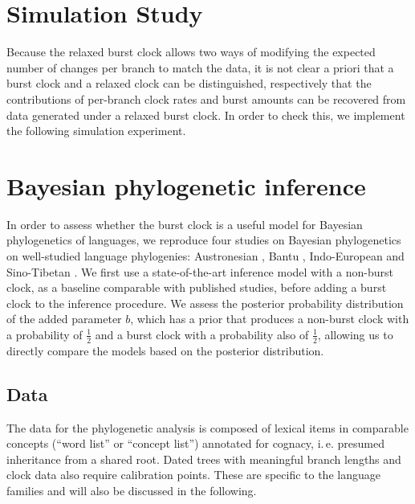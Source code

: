\documentclass[a4paper,12pt]{scrartcl}
\begin{document}
\section{Simulation Study}
Because the relaxed burst clock allows two ways of modifying the expected number
of changes per branch to match the data, it is not clear a priori that a burst
clock and a relaxed clock can be distinguished, respectively that the
contributions of per-branch clock rates and burst amounts can be recovered from
data generated under a relaxed burst clock.
In order to check this, we implement the following simulation experiment.

\section{Bayesian phylogenetic inference}

In order to assess whether the burst clock is a useful model for Bayesian
phylogenetics of languages, we reproduce four studies on Bayesian phylogenetics
on well-studied language phylogenies:
Austronesian
\parencite{gray2009language,greenhill2017evolutionary,greenhill2018population},
Bantu
\parencite{grollemund2015bantu,greenhill2018population,currie2013cultural},
Indo-European
\parencite{bouckaert2012mapping,chang2015ancestryconstrained,gray2003language,holm2017steppe,rama2018three,willems2016using}
and
Sino-Tibetan \parencite{sagart2019dated,zhang2019phylogenetic}.
We first
use a state-of-the-art inference model with a non-burst clock, as a baseline
comparable with published studies, before adding a burst clock to the inference
procedure. We assess the posterior probability distribution of the added
parameter $b$, which has a prior that produces a non-burst clock with a
probability of $\frac{1}{2}$ and a burst clock with a probability also of
$\frac{1}{2}$, allowing us to directly compare the models based on the posterior
distribution.

\subsection{Data}
The data for the phylogenetic analysis is composed of lexical items in comparable concepts (“word list” or “concept list”) annotated
for cognacy, i.\,e. presumed inheritance from a shared root. Dated trees with meaningful branch lengths and clock data also require calibration points.
These are specific to the language families and will also be discussed in the following.
\end{document}

